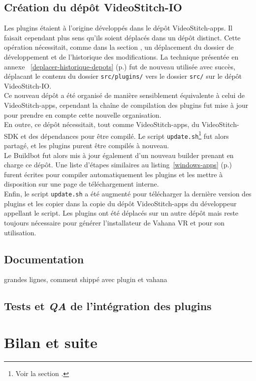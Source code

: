 \subsection{Création du dépôt VideoStitch-IO}
Les plugins étaient à l'origine développés dans le dépôt VideoStitch-apps. Il faisait
cependant plus sens qu'ils soient déplacés dans un dépôt distinct. Cette opération
nécessitait, comme dans la section , un déplacement du dossier
de développement et de l'historique des modifications. La technique présentée en annexe~
\ref{deplacer-historique-depots} (p.\pageref{deplacer-historique-depots}) fut de
nouveau utilisée avec succès, déplacant le contenu du dossier \texttt{src/plugins/}
vers le dossier \texttt{src/} sur le dépôt VideoStitch-IO.\\
\newline
Ce nouveau dépôt a été organisé de manière sensiblement équivalente à celui de VideoStitch-apps, 
cependant la chaîne de compilation des plugins fut mise à jour pour prendre en compte
cette nouvelle organisation.\\
En outre, ce dépôt nécessitait, tout comme VideoStitch-apps, du VideoStitch-SDK et des dépendances
pour être compilé. Le script \texttt{update.sh}\footnote{Voir la section .}
fut alors partagé, et les plugins purent être compilés à nouveau.\\
\newline
Le Buildbot fut alors mis à jour également d'un nouveau builder prenant en charge ce dépôt.
Une liste d'étapes similaires au listing~\ref{windows-apps} (p.\pageref{windows-apps}) furent écrites pour
compiler automatiquement les plugins et les mettre à disposition sur une page de 
téléchargement interne.\\
Enfin, le script \texttt{update.sh} a été augmenté pour télécharger
la dernière version des plugins et les copier dans la copie du dépôt VideoStitch-apps
du développeur appellant le script. Les plugins ont été déplacés sur un autre dépôt
mais reste toujours nécessaire pour générer l'installateur de Vahana VR et pour
son utilisation.

\subsection{Documentation}
grandes lignes, comment shippé avec plugin et vahana

\subsection{Tests et \textit{QA} de l'intégration des plugins}


\section{Bilan et suite}

